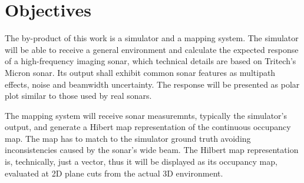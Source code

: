 

\section{Objectives}


The by-product of this work is a simulator and a mapping system. The simulator
will be able to receive a general environment and calculate the expected
response of a high-frequency imaging sonar, which technical details are based on
Tritech's Micron sonar. Its output shall exhibit common sonar features as
multipath effects, noise and beamwidth uncertainty. The response will be
presented as polar plot similar to those used by real sonars.

The mapping system will receive sonar measuremnts, typically the simulator's
output, and generate a Hibert map representation of the continuous occupancy map.
The map has to match to the simulator ground truth avoiding inconsistencies
caused by the sonar's wide beam. The Hilbert map representation is, technically,
just a vector, thus it will be displayed as its occupancy map, evaluated at 2D
plane cuts from the actual 3D environment.




% 
% 

